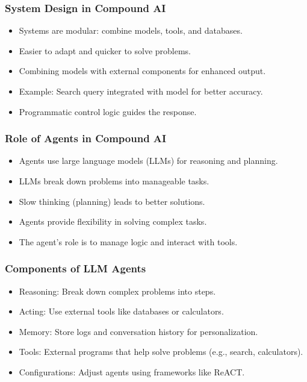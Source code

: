 \begin{frame}[fragile]\frametitle{System Design in Compound AI}
    \begin{itemize}
        \item Systems are modular: combine models, tools, and databases.
        \item Easier to adapt and quicker to solve problems.
        \item Combining models with external components for enhanced output.
        \item Example: Search query integrated with model for better accuracy.
        \item Programmatic control logic guides the response.
    \end{itemize}
\end{frame}

\begin{frame}[fragile]\frametitle{Role of Agents in Compound AI}
    \begin{itemize}
        \item Agents use large language models (LLMs) for reasoning and planning.
        \item LLMs break down problems into manageable tasks.
        \item Slow thinking (planning) leads to better solutions.
        \item Agents provide flexibility in solving complex tasks.
        \item The agent's role is to manage logic and interact with tools.
    \end{itemize}
\end{frame}

\begin{frame}[fragile]\frametitle{Components of LLM Agents}
    \begin{itemize}
        \item Reasoning: Break down complex problems into steps.
        \item Acting: Use external tools like databases or calculators.
        \item Memory: Store logs and conversation history for personalization.
        \item Tools: External programs that help solve problems (e.g., search, calculators).
        \item Configurations: Adjust agents using frameworks like ReACT.
    \end{itemize}
\end{frame}

